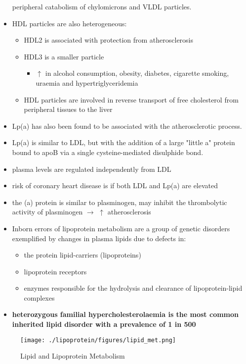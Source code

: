 \documentclass{scrartcl}
\begin{document}
\begin{itemize}
peripheral catabolism of chylomicrons and VLDL particles.
\item HDL particles are also heterogeneous:
\begin{itemize}
\item HDL2 is associated with protection from atherosclerosis
\item HDL3 is a smaller particle
\begin{itemize}
\item \(\uparrow\) in alcohol consumption, obesity, diabetes, cigarette
smoking, uraemia and hypertriglyceridemia
\end{itemize}
\item HDL particles are involved in reverse transport of free
cholesterol from peripheral tissues to the liver
\end{itemize}
\item Lp(a) has also been found to be associated with the atherosclerotic
process.
\item Lp(a) is similar to LDL, but with the addition of a large "little a"
protein bound to apoB via a single cysteine-mediated disulphide
bond.
\item plasma levels are regulated independently from LDL
\item risk of coronary heart disease is \Uparrowcreased if both LDL and
Lp(a) are elevated
\item the (a) protein is similar to plasminogen, may inhibit the
thrombolytic activity of plasminogen \(\to\) \(\uparrow\) atherosclerosis

\item Inborn errors of lipoprotein metabolism are a group of genetic
disorders exemplified by changes in plasma lipids due to defects in:
\begin{itemize}
\item the protein lipid-carriers (lipoproteins)
\item lipoprotein receptors
\item enzymes responsible for the hydrolysis and clearance of
lipoprotein-lipid complexes
\end{itemize}
\item \textbf{heterozygous familial hypercholesterolaemia is the most common}
\textbf{inherited lipid disorder with a prevalence of 1 in 500}
\end{itemize}

\begin{figure}[htbp]
\centering
\texttt{[image: ./lipoprotein/figures/lipid\_met.png]}
\caption{\label{fig:org9c345f9}
Lipid and Lipoprotein Metabolism}
\end{figure}
\end{document}
